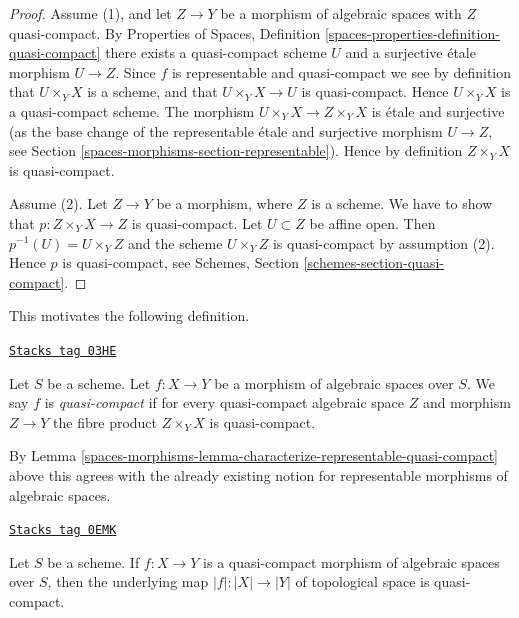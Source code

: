 \begin{proof}
Assume (1), and let $Z \to Y$ be a morphism of algebraic spaces with
$Z$ quasi-compact. By
Properties of Spaces,
Definition \ref{spaces-properties-definition-quasi-compact}
there exists a quasi-compact scheme $U$ and a surjective \'etale
morphism $U \to Z$. Since $f$ is representable and quasi-compact
we see by definition that $U \times_Y X$ is a scheme, and that
$U \times_Y X \to U$ is quasi-compact. Hence $U \times_Y X$ is
a quasi-compact scheme. The morphism $U \times_Y X \to Z \times_Y X$
is \'etale and surjective (as the base change of the representable
\'etale and surjective morphism $U \to Z$, see
Section \ref{spaces-morphisms-section-representable}).
Hence by definition $Z \times_Y X$ is quasi-compact.

\medskip\noindent
Assume (2). Let $Z \to Y$ be a morphism, where $Z$ is a scheme.
We have to show that $p : Z \times_Y X \to Z$ is quasi-compact.
Let $U \subset Z$ be affine open. Then $p^{-1}(U) = U \times_Y Z$
and the scheme $U \times_Y Z$ is quasi-compact by assumption (2).
Hence $p$ is quasi-compact, see
Schemes, Section \ref{schemes-section-quasi-compact}.
\end{proof}

This motivates the following definition.

\begin{definition}
\label{spaces-morphisms-definition-quasi-compact}
\href{https://stacks.math.columbia.edu/tag/03HE}{\texttt{Stacks tag 03HE}}

Let $S$ be a scheme.
Let $f : X \to Y$ be a morphism of algebraic spaces over $S$.
We say $f$ is {\it quasi-compact} if for every quasi-compact
algebraic space $Z$ and morphism $Z \to Y$ the fibre product
$Z \times_Y X$ is quasi-compact.
\end{definition}

By Lemma \ref{spaces-morphisms-lemma-characterize-representable-quasi-compact}
above this agrees with the already existing notion
for representable morphisms of algebraic spaces.

\begin{lemma}
\label{spaces-morphisms-lemma-quasi-compact-is-quasi-compact}
\href{https://stacks.math.columbia.edu/tag/0EMK}{\texttt{Stacks tag 0EMK}}

Let $S$ be a scheme. If $f : X \to Y$ is a quasi-compact morphism of
algebraic spaces over $S$, then the underlying map
$|f| : |X| \to |Y|$ of topological space is quasi-compact.
\end{lemma}


